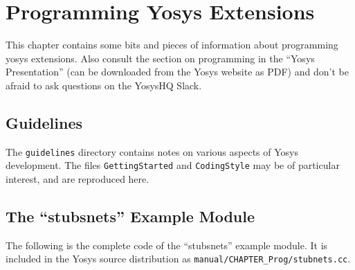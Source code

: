 
\chapter{Programming Yosys Extensions}
\label{chapter:prog}

This chapter contains some bits and pieces of information about programming
yosys extensions. Also consult the section on programming in the ``Yosys
Presentation'' (can be downloaded from the Yosys website as PDF) and don't
be afraid to ask questions on the YosysHQ Slack.

\section{Guidelines}

The {\tt guidelines} directory contains notes on various aspects of Yosys development. The files {\tt GettingStarted} and {\tt CodingStyle} may be of particular interest, and are reproduced here.





\section{The ``stubsnets'' Example Module}

The following is the complete code of the ``stubsnets'' example module. It is included in the Yosys source distribution as {\tt manual/CHAPTER\_Prog/stubnets.cc}.







